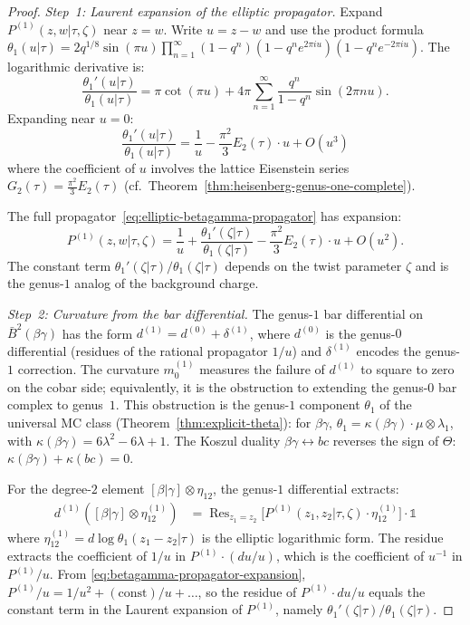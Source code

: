 \begin{proof}
\emph{Step~1: Laurent expansion of the elliptic propagator.}
Expand $P^{(1)}(z,w|\tau,\zeta)$ near $z = w$.  Write
$u = z - w$ and use the product formula
$\theta_1(u|\tau) = 2q^{1/8}\sin(\pi u)
\prod_{n=1}^\infty (1-q^n)(1-q^n e^{2\pi i u})(1-q^n e^{-2\pi i u})$.
The logarithmic derivative is:
\begin{equation}\label{eq:logderiv-theta1}
\frac{\theta_1'(u|\tau)}{\theta_1(u|\tau)}
= \pi \cot(\pi u) + 4\pi \sum_{n=1}^\infty
\frac{q^n}{1-q^n} \sin(2\pi n u).
\end{equation}
Expanding near $u = 0$:
\[
\frac{\theta_1'(u|\tau)}{\theta_1(u|\tau)}
= \frac{1}{u} - \frac{\pi^2}{3} E_2(\tau) \cdot u + O(u^3)
\]
where the coefficient of $u$ involves the lattice Eisenstein series
$G_2(\tau) = \frac{\pi^2}{3} E_2(\tau)$
(cf.\ Theorem~\ref{thm:heisenberg-genus-one-complete}).

The full propagator~\eqref{eq:elliptic-betagamma-propagator}
has expansion:
\begin{equation}\label{eq:betagamma-propagator-expansion}
P^{(1)}(z,w|\tau,\zeta) = \frac{1}{u}
+ \frac{\theta_1'(\zeta|\tau)}{\theta_1(\zeta|\tau)}
- \frac{\pi^2}{3} E_2(\tau) \cdot u + O(u^2).
\end{equation}
The constant term $\theta_1'(\zeta|\tau)/\theta_1(\zeta|\tau)$
depends on the twist parameter $\zeta$ and is the genus-$1$ analog
of the background charge.

\emph{Step~2: Curvature from the bar differential.}
The genus-$1$ bar differential on $\bar{B}^2(\beta\gamma)$ has the
form $d^{(1)} = d^{(0)} + \delta^{(1)}$, where $d^{(0)}$ is the
genus-$0$ differential (residues of the rational propagator $1/u$)
and $\delta^{(1)}$ encodes the genus-$1$ correction.  The
curvature $m_0^{(1)}$ measures the failure of $d^{(1)}$ to
square to zero on the cobar side; equivalently, it is the
obstruction to extending the genus-$0$ bar complex to genus~$1$.
This obstruction is the genus-$1$ component $\theta_1$ of the
universal MC class (Theorem~\ref{thm:explicit-theta}):
for $\beta\gamma$, $\theta_1 = \kappa(\beta\gamma) \cdot \mu
\otimes \lambda_1$, with $\kappa(\beta\gamma) =
6\lambda^2 - 6\lambda + 1$.
The Koszul duality $\beta\gamma \leftrightarrow bc$ reverses the
sign of $\Theta$: $\kappa(\beta\gamma) + \kappa(bc) = 0$.

For the degree-$2$ element $[\beta|\gamma] \otimes \eta_{12}$,
the genus-$1$ differential extracts:
\begin{align}\label{eq:genus1-bar-betagamma-deg2}
d^{(1)}([\beta|\gamma] \otimes \eta_{12}^{(1)})
&= \operatorname{Res}_{z_1 = z_2}
\bigl[P^{(1)}(z_1,z_2|\tau,\zeta) \cdot \eta_{12}^{(1)}\bigr]
\cdot \mathbb{1}
\end{align}
where $\eta_{12}^{(1)} = d\log\theta_1(z_1 - z_2|\tau)$ is the
elliptic logarithmic form.  The residue extracts the
coefficient of $1/u$ in $P^{(1)} \cdot (du/u)$, which is the
coefficient of $u^{-1}$ in $P^{(1)}/u$.  From
\eqref{eq:betagamma-propagator-expansion},
$P^{(1)}/u = 1/u^2 + (\text{const})/u + \ldots$,
so the residue of $P^{(1)} \cdot du/u$ equals the constant term
in the Laurent expansion of $P^{(1)}$, namely
$\theta_1'(\zeta|\tau)/\theta_1(\zeta|\tau)$.


\end{proof}
